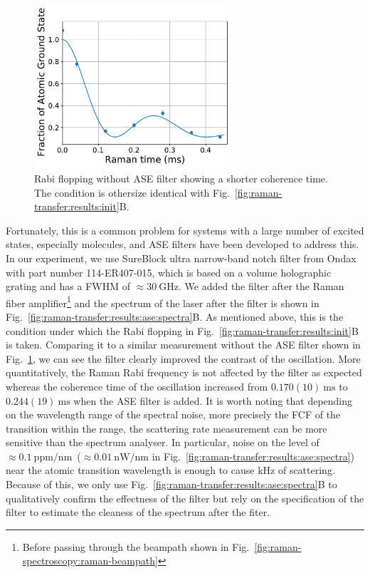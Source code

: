 \begin{figure}
  \centering
  \includegraphics[width=0.65\textwidth]{figures/raman_transfer_fit_zero_ase_time.pdf}
  \caption[Rabi flopping without ASE filter.]{
    Rabi flopping without ASE filter showing a shorter coherence time.
    The condition is othersize identical with Fig.~\ref{fig:raman-transfer:results:init}B.
    \label{fig:raman-transfer:results:ase:zero}}
\end{figure}

Fortunately, this is a common problem for systems with a large number of excited states,
especially molecules, and ASE filters have been developed to address this.
In our experiment, we use SureBlock ultra narrow-band notch filter from Ondax
with part number 114-ER407-015,
which is based on a volume holographic grating and has a FWHM of $\approx\!30~\mathrm{GHz}$.
We added the filter after the Raman fiber amplifier\footnote{
  Before passing through the beampath shown in Fig.~\ref{fig:raman-spectroscopy:raman-beampath}
} and the spectrum of the laser after the filter is shown in
Fig.~\ref{fig:raman-transfer:results:ase:spectra}B.
As mentioned above, this is the condition under which the Rabi flopping
in Fig.~\ref{fig:raman-transfer:results:init}B is taken.
Comparing it to a similar measurement without the ASE filter shown in
Fig.~\ref{fig:raman-transfer:results:ase:zero},
we can see the filter clearly improved the contrast of the oscillation.
More quantitatively, the Raman Rabi frequency is not affected by the filter as expected
whereas the coherence time of the oscillation increased from $0.170(10)~\mathrm{ms}$
to $0.244(19)~\mathrm{ms}$ when the ASE filter is added.
It is worth noting that depending on the wavelength range of the spectral noise,
more precisely the FCF of the transition within the range,
the scattering rate measurement can be more sensitive than the spectrum analyser.
In particular, noise on the level of
$\approx\!0.1~\mathrm{ppm/nm}$~($\approx\!0.01~\mathrm{nW/nm}$
in Fig.~\ref{fig:raman-transfer:results:ase:spectra}) near the atomic transition wavelength
is enough to cause kHz of scattering.
Because of this, we only use Fig.~\ref{fig:raman-transfer:results:ase:spectra}B
to qualitatively confirm the effectness of the filter
but rely on the specification of the filter
to estimate the cleaness of the spectrum after the fiter.

